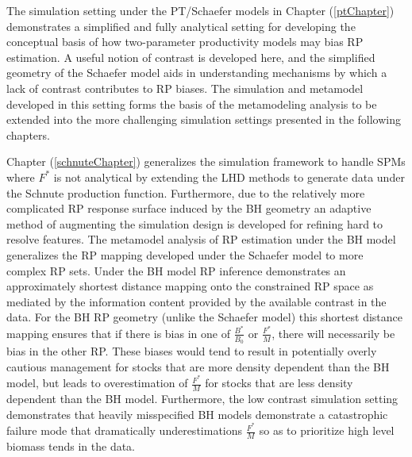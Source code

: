 \documentclass[12pt]{ucscthesis}
\begin{document}
%
The simulation setting under the PT/Schaefer models in Chapter (\ref{ptChapter}) 
demonstrates a simplified and fully analytical setting for developing the 
conceptual basis of how two-parameter productivity models may bias RP estimation. 
A useful notion of contrast is developed here, and the simplified geometry of the 
Schaefer model aids in understanding mechanisms by which a lack of contrast 
contributes to RP biases.
The simulation and metamodel developed in this setting forms the basis of the 
metamodeling analysis to be extended into the more challenging simulation settings 
presented in the following chapters.


%
Chapter (\ref{schnuteChapter}) generalizes the simulation framework to handle 
SPMs where $F^*$ is not analytical by extending the LHD methods to generate data 
under the Schnute production function. Furthermore, due to the relatively more 
complicated RP response surface induced by the BH geometry an adaptive method of 
augmenting the simulation design is developed for refining hard to resolve features. 
The metamodel analysis of RP estimation under the BH model generalizes the RP 
mapping developed under the Schaefer model to more complex RP sets. Under the 
BH model RP inference demonstrates an approximately shortest distance mapping 
onto the constrained RP space as mediated by the information content provided 
by the available contrast in the data. For the BH RP geometry (unlike the Schaefer model) 
this shortest distance mapping ensures that if there is bias in one of $\frac{B^*}{B_0}$ or 
$\frac{F^*}{M}$, there will necessarily be bias in the other RP. These biases 
would tend to result in potentially overly cautious management for stocks that 
are more density dependent than the BH model, but leads to overestimation of $\frac{F^*}{M}$ for %
stocks that are less density dependent than the BH model. %
Furthermore, the low contrast simulation setting demonstrates that heavily 
misspecified BH models demonstrate a catastrophic failure mode that 
dramatically underestimations $\frac{F^*}{M}$ so as to prioritize high level 
biomass tends in the data. 
\end{document}
